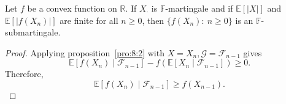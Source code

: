 \begin{theorem}
Let $f$ be a convex function on $\mathbb{R}$.
If $X_{\cdot}$ is $\mathbb{F}$-martingale and if $\mathbb{E}[|X|]$ and $\mathbb{E}[|f(X_n)|]$ are finite for all $n\ge0$, then 
$\{f(X_n):~n\ge0\}$ is an $\mathbb{F}$-submartingale.
\end{theorem}
\begin{proof}
Applying proposition~\ref{pro:8:2} with $X=X_n,\mathcal{G}=\mathcal{F}_{n-1}$ gives
\[
 \mathbb{E}[f(X_n)\mid\mathcal{F}_{n-1}]-f(\mathbb{E}[X_n\mid\mathcal{F}_{n-1}])\ge0.
\]
Therefore, 
\[
 \mathbb{E}[f(X_n)\mid\mathcal{F}_{n-1}]\ge f(X_{n-1}).
\]
\end{proof}




















